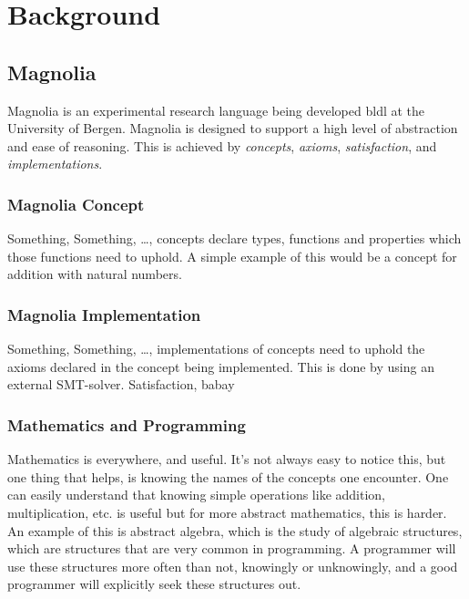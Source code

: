 \chapter{Background} \label{cha:background}

\section{Magnolia}

Magnolia is an experimental research language being developed \gls{bldl} at the
University of Bergen. Magnolia is designed to support a high level of 
abstraction and ease of reasoning. This is achieved by \textit{concepts},
\textit{axioms}, \textit{satisfaction}, and \textit{implementations}.

\subsection{Magnolia Concept}

Something, Something, \dots, concepts declare types, functions and properties
which those functions need to uphold. A simple example of this would be a
concept for addition with natural numbers.

\subsection{Magnolia Implementation}

Something, Something, \dots, implementations of concepts need to uphold the
axioms declared in the concept being implemented. This is done by using an
external SMT-solver. Satisfaction, babay


\subsection{Mathematics and Programming}

Mathematics is everywhere, and useful. It's not always easy to notice this, but
one thing that helps, is knowing the names of the concepts one encounter. One
can easily understand that knowing simple operations like addition,
multiplication, etc. is useful but for more abstract mathematics, this is
harder. An example of this is abstract algebra, which is the study of algebraic
structures, which are structures that are very common in programming. A
programmer will use these structures more often than not, knowingly or
unknowingly, and a good programmer will explicitly seek these structures out.

